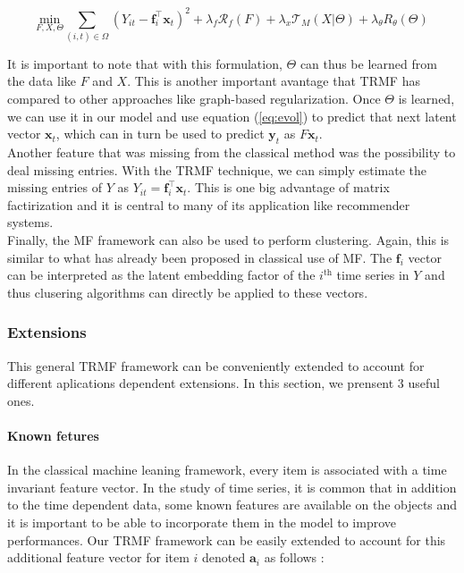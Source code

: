 \documentclass{article}
\begin{document}
\begin{equation}
\underset{F,X,\Theta}{\text{min}} \sum_{(i,t) \in \Omega} (Y_{it} - \mathbf{f}_i^\top\mathbf{x}_t)^2 + \lambda_f \mathcal{R}_f(F) + \lambda_x \mathcal{T}_M(X | \Theta) + \lambda_{\theta} R_{\theta}(\Theta)
\label{eq:model_theta}
\end{equation}

It is important to note that with this formulation, $\Theta$ can thus be learned from the data like $F$ and $X$. This is another important avantage that TRMF has compared to other approaches like graph-based regularization.
Once $\Theta$ is learned, we can use it in our model and use equation (\ref{eq:evol}) to predict that next latent vector $\mathbf{x}_t$, which can in turn be used to predict $\mathbf{y}_t$ as $F\mathbf{x}_t$. \\
Another feature that was missing from the classical method was the possibility to deal missing entries. With the TRMF technique, we can simply estimate the missing entries of $Y$ as $Y_{it} = \mathbf{f}_i^\top\mathbf{x}_t$.
This is one big advantage of matrix factirization and it is central to many of its application like recommender systems. \\
Finally, the MF framework can also be used to perform clustering. Again, this is similar to what has already been proposed in classical use of MF. The $\mathbf{f}_i$ vector can be interpreted as the latent embedding factor of the $i^\text{th}$ time series in $Y$ and thus clusering algorithms can directly be applied to these vectors.

\subsubsection*{Extensions}
This general TRMF framework can be conveniently extended to account for different aplications dependent extensions. In this section, we prensent $3$ useful ones.

\paragraph{Known fetures}
In the classical machine leaning framework, every item is associated with a time invariant feature vector. In the study of time series, it is common that in addition to the time dependent data, some known features are available on the objects and it is important to be able to incorporate them in the model to improve performances. Our TRMF framework can be easily extended to account for this additional feature vector for item $i$ denoted $\mathbf{a}_i$ as follows :
\end{document}
